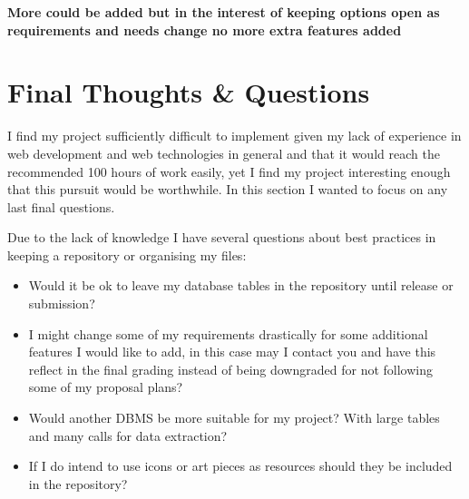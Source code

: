 \documentclass[11pt, a4paper]{article}
\begin{document}
\textbf{More could be added but in the interest of keeping options open as requirements and needs change no more extra features added} 

\section{Final Thoughts \& Questions}

I find my project sufficiently difficult to implement given my lack of experience in web development and web technologies in general and that it would reach the recommended 100 hours of work easily, yet I find my project interesting enough that this pursuit would be worthwhile. In this section I wanted to focus on any last final questions.

Due to the lack of knowledge I have several questions about best practices in keeping a repository or organising my files:

\begin{itemize}
\item Would it be ok to leave my database tables in the repository until release or submission?
\item I might change some of my requirements drastically for some additional features I would like to add, in this case may I contact you and have this reflect in the final grading instead of being downgraded for not following some of my proposal plans?
\item Would another DBMS be more suitable for my project? With large tables and many calls for data extraction?
\item If I do intend to use icons or art pieces as resources should they be included in the repository?
\end{itemize}
\end{document}
